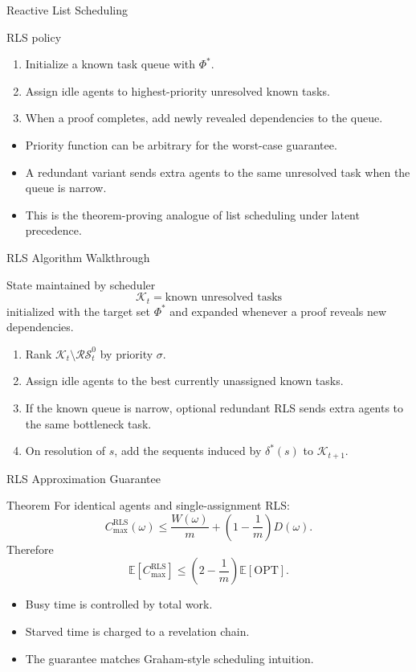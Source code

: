\documentclass[10pt,aspectratio=169]{beamer}
\newcommand{\OPT}{\mathrm{OPT}}
\newcommand{\RS}{\mathcal{RS}}
\begin{document}
\begin{frame}{Reactive List Scheduling}
\small
\begin{block}{RLS policy}
\begin{enumerate}
  \item Initialize a known task queue with $\Phi^*$.
  \item Assign idle agents to highest-priority unresolved known tasks.
  \item When a proof completes, add newly revealed dependencies to the queue.
\end{enumerate}
\end{block}

\begin{itemize}
  \item Priority function can be arbitrary for the worst-case guarantee.
  \item A redundant variant sends extra agents to the same unresolved task when the queue is narrow.
  \item This is the theorem-proving analogue of list scheduling under latent precedence.
\end{itemize}
\end{frame}

\begin{frame}{RLS Algorithm Walkthrough}
\small
\begin{block}{State maintained by scheduler}
\[
\mathcal{K}_t=\text{known unresolved tasks}
\]
initialized with the target set $\Phi^*$ and expanded whenever a proof reveals new dependencies.
\end{block}

\begin{enumerate}
  \item Rank $\mathcal{K}_t\setminus\RS^0_t$ by priority $\sigma$.
  \item Assign idle agents to the best currently unassigned known tasks.
  \item If the known queue is narrow, optional redundant RLS sends extra agents to the same bottleneck task.
  \item On resolution of $s$, add the sequents induced by $\delta^*(s)$ to $\mathcal{K}_{t+1}$.
\end{enumerate}
\end{frame}

\begin{frame}{RLS Approximation Guarantee}
\small
\begin{block}{Theorem}
For identical agents and single-assignment RLS:
\[
C_{\max}^{\mathrm{RLS}}(\omega)
\le
\frac{W(\omega)}{m}+\left(1-\frac{1}{m}\right)D(\omega).
\]
Therefore
\[
\mathbb{E}[C_{\max}^{\mathrm{RLS}}]\le
\left(2-\frac{1}{m}\right)\mathbb{E}[\OPT].
\]
\end{block}

\begin{itemize}
  \item Busy time is controlled by total work.
  \item Starved time is charged to a revelation chain.
  \item The guarantee matches Graham-style scheduling intuition.
\end{itemize}
\end{frame}
\end{document}
